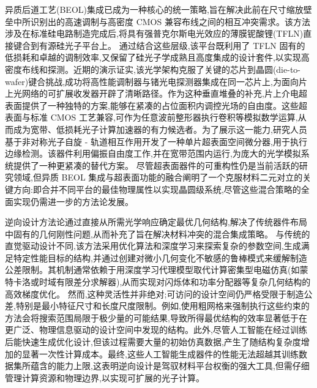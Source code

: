 异质后道工艺(BEOL)集成已成为一种核心的统一策略,旨在解决此前在尺寸缩放壁垒中所识别出的高速调制与高密度 CMOS 兼容布线之间的相互冲突需求。该方法涉及在标准硅电路制造完成后,将具有强普克尔斯电光效应的薄膜铌酸锂(TFLN)直接键合到有源硅光子平台上。\citep{s2_9b444e84d20ae6e3d62d2d4df30268b5a53baad2_40af2cc9} 通过结合这些层级,该平台既利用了 TFLN 固有的低损耗和卓越的调制效率,又保留了硅光子学成熟且高度集成的设计套件,以实现高密度布线和探测。近期的演示证实,该光学架构克服了关键的芯片到晶圆(die-to-wafer)键合挑战,成功将高性能调制器与锗光电探测器集成在同一芯片上,为面向片上光网络的可扩展收发器开辟了清晰路径。作为这种垂直堆叠的补充,片上介电超表面提供了一种独特的方案,能够在紧凑的占位面积内调控光场的自由度。这些超表面与标准 CMOS 工艺兼容,可作为任意波前整形器执行卷积等模拟数学运算,从而成为宽带、低损耗光子计算加速器的有力候选者。为了展示这一能力,研究人员基于非对称光子自旋 - 轨道相互作用开发了一种单片超表面空间微分器,用于执行边缘检测。该器件利用偏振自由度工作,并在宽带范围内运行,为庞大的光学模拟系统提供了一种更紧凑的替代方案。\citep{doi_10_1515_nanoph_2020_0366_58f1aa1d} 尽管超表面器件的可重构性仍是当前活跃的研究领域,但异质 BEOL 集成与超表面功能的融合阐明了一个克服材料二元对立的关键方向:即合并不同平台的最佳物理属性以实现晶圆级系统,尽管这些混合策略的全面实现仍需进一步的方法论发展。\citep{s2_9b444e84d20ae6e3d62d2d4df30268b5a53baad2_40af2cc9} \citep{doi_10_1515_nanoph_2022_0294_1bd118d5}

逆向设计方法论通过直接从所需光学响应确定最优几何结构,解决了传统器件布局中固有的几何刚性问题,从而补充了旨在解决材料冲突的混合集成策略。\citep{doi_10_1364_oe_524318_cf5f0d79} \citep{doi_10_1364_ol_453299_4bc70b17} 与传统的直觉驱动设计不同,该方法采用优化算法和深度学习来探索复杂的参数空间,生成满足特定性能目标的结构,并通过创建对微小几何变化不敏感的鲁棒模式来缓解制造公差限制。其机制通常依赖于用深度学习代理模型取代计算密集型电磁仿真(如蒙特卡洛或时域有限差分求解器),从而实现对闪烁体和功率分配器等复杂几何结构的高效梯度优化。\citep{doi_10_1109_jmmct_2026_3695747_9d633c4d} \citep{doi_10_17725_j_rensit_2026_18_163_741010b8} 然而,这种灵活性并非绝对;可访问的设计空间仍严格受限于制造公差,特别是最小特征尺寸和长度尺度限制。例如,使用粗网格来强制执行这些约束的方法会将搜索范围局限于极少量的可能结果,导致所得最优结构的效率显著低于在更广泛、物理信息驱动的设计空间中发现的结构。此外,尽管人工智能在经过训练后能快速生成优化设计,但该过程需要大量的初始仿真数据,产生了随结构复杂度增加的显著一次性计算成本。最终,这些人工智能生成器件的性能无法超越其训练数据集所蕴含的能力上限,这表明逆向设计是驾驭材料平台权衡的强大工具,但需仔细管理计算资源和物理边界,以实现可扩展的光子计算。\citep{doi_10_1515_nanoph_2024_0536_4b6631ba} \citep{doi_10_1515_nanoph_2023_0852_cb27a26f} \citep{doi_10_1109_cleo_europe_eqec65582_2025_11110329_26a41a7d}

